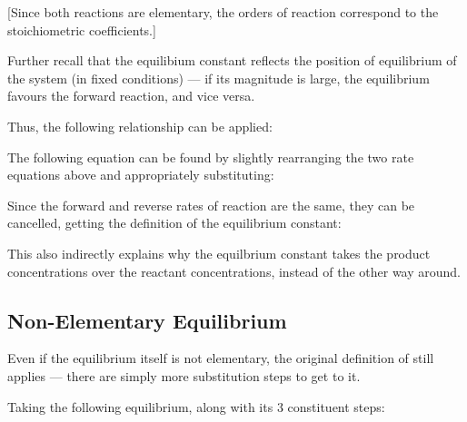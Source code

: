 			\eqndiagram{
				\[ R_{fwd} = k_{fwd}[\ch{N2O4}]  \qquad\qquad  R_{rev} = k_{rev}[\ch{NO2}]^{2} \]
			}[Since both reactions are elementary, the orders of reaction correspond to the stoichiometric coefficients.]

			\pagebreak

			Further recall that the equilibium constant reflects the position of equilibrium of the system (in fixed conditions) --- if its magnitude
			is large, the equilibrium favours the forward reaction, and vice versa.

			Thus, the following relationship can be applied:

			\eqndiagram{
				\[ K_{c} = \frac{k_{fwd}}{k_{rev}} \]
			}

			The following equation can be found by slightly rearranging the two rate equations above and appropriately substituting:

			\eqndiagram{
				\[ K_{c} \quad = \quad \frac{k_{fwd}}{k_{rev}} \quad = \quad \frac{R_{fwd}}{[\ch{N2O4}]}
				\; / \; \frac{R_{rev}}{[\ch{NO2}]^{2}} \]
			}

			Since the forward and reverse rates of reaction are the same, they can be cancelled, getting the definition of the equilibrium constant:

			\eqndiagram{
				\[ K_{c} = \frac{[\ch{NO2}]^{2}}{[\ch{N2O4}]} \]
			}

			This also indirectly explains why the equilbrium constant takes the product concentrations over the reactant concentrations, instead of
			the other way around.


		\pagebreak
		\subsection{Non-Elementary Equilibrium}

			Even if the equilibrium itself is not elementary, the original definition of \Kc{} still applies --- there are simply more substitution
			steps to get to it.

			Taking the following equilibrium, along with its 3 constituent steps:


